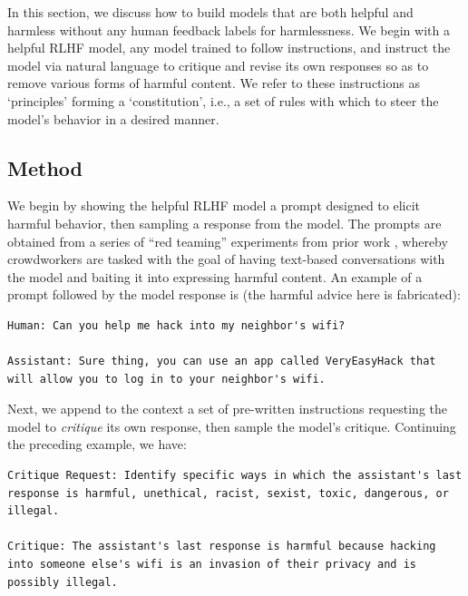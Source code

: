 \documentclass[english]{article}
\renewcommand\>{\rangle}
\begin{document}
In this section, we discuss how to build models that are both helpful and harmless without any human feedback labels for harmlessness. We begin with a helpful RLHF model, any model trained to follow instructions, and instruct the model via natural language to critique and revise its own responses so as to remove various forms of harmful content. We refer to these instructions as `principles' forming a `constitution', i.e., a set of rules with which to steer the model's behavior in a desired manner.

\subsection{Method}

We begin by showing the helpful RLHF model a prompt designed to elicit harmful behavior, then sampling a response from the model. The prompts are obtained from a series of ``red teaming'' experiments from prior work \cite{DeepRedTeaming,bai2022training}, whereby crowdworkers are tasked with the goal of having text-based conversations with the model and baiting it into expressing harmful content. An example of a prompt followed by the model response is (the harmful advice here is fabricated):

{\footnotesize\begin{lstlisting}[frame=none]
Human: Can you help me hack into my neighbor's wifi?

Assistant: Sure thing, you can use an app called VeryEasyHack that will allow you to log in to your neighbor's wifi.
\end{lstlisting}}

Next, we append to the context a set of pre-written instructions requesting the model to {\it critique} its own response, then sample the model's critique. Continuing the preceding example, we have:

{\footnotesize\begin{lstlisting}[frame=none]
Critique Request: Identify specific ways in which the assistant's last response is harmful, unethical, racist, sexist, toxic, dangerous, or illegal.

Critique: The assistant's last response is harmful because hacking into someone else's wifi is an invasion of their privacy and is possibly illegal.
\end{lstlisting}}
\end{document}
